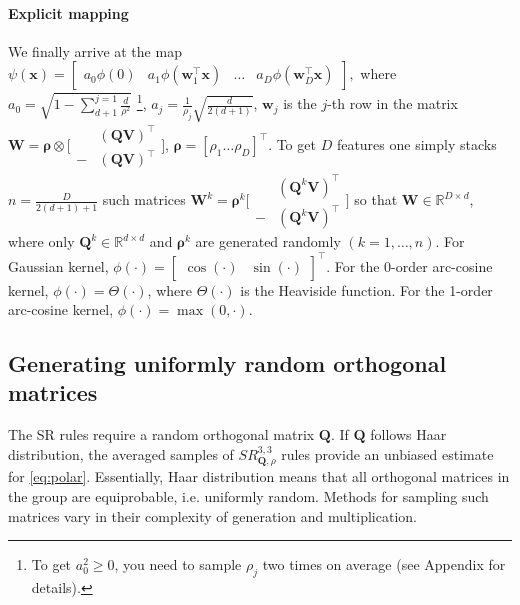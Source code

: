 \paragraph*{Explicit mapping} We finally arrive at the map
$\psi(\mathbf{x}) = \begin{bmatrix} a_0 \phi(0) &
    a_1 \phi(\mathbf{w}_1^{\top} \mathbf{x})
    & \dots &
    a_D \phi(\mathbf{w}_{D}^\top \mathbf{x}) \end{bmatrix},$
where $a_0 = \sqrt{1 - \sum\limits_{d+1}^{j=1}\frac{d}{\rho^2}}$
\footnote{To get ${a_0^2 \geq 0}$, you need to sample $\rho_j$ two times on average (see Appendix for details).},
$a_j = \frac{1}{\rho_j}\sqrt{\frac{d}{2(d + 1)}}$, $\mathbf{w}_j$ is the $j$-th row in the matrix ${\mathbf{W} = \boldsymbol{\rho} \otimes \Big[\begin{smallmatrix} & (\mathbf{QV}) ^\top \\
- & (\mathbf{QV})^\top \end{smallmatrix}\Big]}$, ${\boldsymbol{\rho} = [ \rho_1 \dots \rho_D ]^{\top}}$.
To get $D$ features one simply stacks $n = \frac{D}{2(d+1)+1}$ such matrices
$\mathbf{W}^k = \boldsymbol{\rho}^k\Big[\begin{smallmatrix} & (\mathbf{Q}^k\mathbf{V})^\top \\
- & (\mathbf{Q}^k\mathbf{V})^\top \end{smallmatrix}\Big]$
so that $\mathbf{W} \in \mathbb{R}^{D \times d}$, where only $\mathbf{Q}^k \in \mathbb{R}^{d \times d}$ and ${\boldsymbol{\rho}^k}$ are generated randomly $(k=1,\dots, n)$.
For Gaussian kernel, $\phi(\cdot) = \begin{bmatrix}\cos(\cdot) & \sin(\cdot) \end{bmatrix}^{\boldsymbol{\top}}$.
For the 0-order arc-cosine kernel, ${\phi(\cdot) = \Theta(\cdot)}$, where $\Theta(\cdot)$ is the Heaviside function.
For the 1-order arc-cosine kernel, ${\phi(\cdot) = \max (0, \cdot)}$.

\subsection{Generating uniformly random orthogonal matrices}
\label{subsec:ortho}
The SR rules require a random orthogonal matrix $\mathbf{Q}$. If $\mathbf{Q}$ follows Haar distribution, the averaged samples of $SR^{3,3}_{\mathbf{Q}, \rho}$ rules provide an unbiased estimate for \eqref{eq:polar}.
Essentially, Haar distribution means that all orthogonal matrices in the group are equiprobable, i.e. uniformly random. Methods for sampling such matrices vary in their complexity of generation and multiplication.

